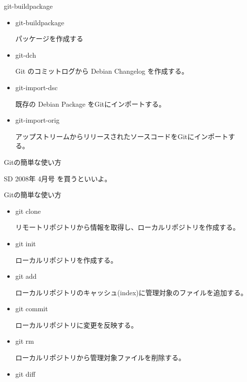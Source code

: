 \documentclass[cjk,dvipdfmx,12pt]{beamer}
\begin{document}
\begin{frame}{git-buildpackage}

\begin{itemize}

\item git-buildpackage 

パッケージを作成する \\
\item git-dch 

Git のコミットログから Debian Changelog を作成する。\\
\item git-import-dsc 

既存の Debian Package をGitにインポートする。\\
\item git-import-orig 

アップストリームからリリースされたソースコードをGitにインポートする。\\

\end{itemize}
\end{frame}

\begin{frame}{Gitの簡単な使い方}
\begin{center}
SD 2008年 4月号 を買うといいよ。
\end{center}
\end{frame}

\begin{frame}{Gitの簡単な使い方}
   \begin{itemize}
\item git clone

リモートリポジトリから情報を取得し、ローカルリポジトリを作成する。\

\item git init

ローカルリポジトリを作成する。\\
\item git add

ローカルリポジトリのキャッシュ(index)に管理対象のファイルを追加する。\\
\item git commit

ローカルリポジトリに変更を反映する。\\
\item git rm

ローカルリポジトリから管理対象ファイルを削除する。\\
\item git diff

\end{itemize}
\end{frame}
\end{document}
